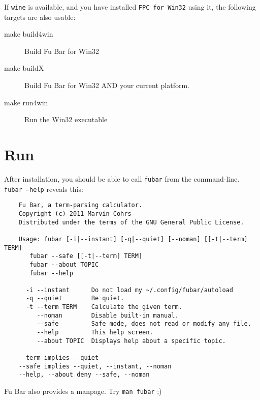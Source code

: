 \documentclass[12pt,a4paper]{article}
\begin{document}
	If \texttt{wine} is available, and you have installed \texttt{FPC for
	Win32} using it, the following targets are also usable:
	
	\begin{description}
	  \item[make build4win] Build Fu Bar for Win32
	  \item[make buildX] Build Fu Bar for Win32 AND your current platform.
	  \item[make run4win] Run the Win32 executable
	\end{description}
	
	\section{Run}
	
	After installation, you should be able to call \texttt{fubar} from
	the command-line.\\
	\texttt{fubar --help} reveals this:
	
	\begin{verbatim}
	Fu Bar, a term-parsing calculator.
	Copyright (c) 2011 Marvin Cohrs
	Distributed under the terms of the GNU General Public License.

	Usage: fubar [-i|--instant] [-q|--quiet] [--noman] [[-t|--term] TERM]
       fubar --safe [[-t|--term] TERM]
       fubar --about TOPIC
       fubar --help

	  -i --instant      Do not load my ~/.config/fubar/autoload
	  -q --quiet        Be quiet.
	  -t --term TERM    Calculate the given term.
	     --noman        Disable built-in manual.
	     --safe         Safe mode, does not read or modify any file.
	     --help         This help screen.
	     --about TOPIC  Displays help about a specific topic.
     
	--term implies --quiet
	--safe implies --quiet, --instant, --noman
	--help, --about deny --safe, --noman
	\end{verbatim}
	
	Fu Bar also provides a manpage. Try \texttt{man fubar} ;)
\end{document}
